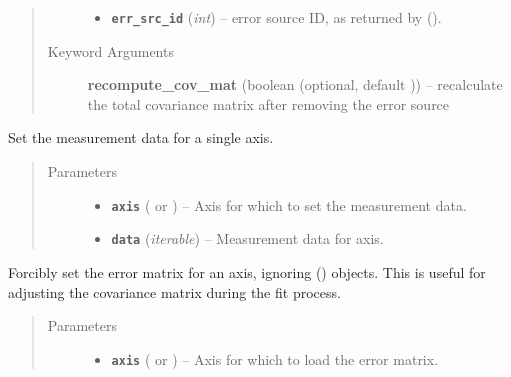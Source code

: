 \documentclass[a4paper,10pt,english]{sphinxmanual}
\begin{document}
\begin{fulllineitems}
\begin{fulllineitems}
\begin{quote}
\begin{description}
\begin{itemize}
\item {} 
\textbf{\texttt{err\_src\_id}} (\emph{int}) -- error source ID, as returned by
{\hyperref[index:kafe.dataset.Dataset.add_error_source]{\emph{}}} ().

\end{itemize}

\item[{Keyword Arguments}] \leavevmode
\textbf{recompute\_cov\_mat} (boolean (optional, default )) --
recalculate the total covariance matrix after removing the error
source

\end{description}\end{quote}

\end{fulllineitems}


\begin{fulllineitems}
\label{index:kafe.dataset.Dataset.set_axis_data}
Set the measurement data for a single axis.
\begin{quote}\begin{description}
\item[{Parameters}] \leavevmode\begin{itemize}
\item {} 
\textbf{\texttt{axis}} ( or ) -- Axis for which to set the measurement data.

\item {} 
\textbf{\texttt{data}} (\emph{iterable}) -- Measurement data for axis.

\end{itemize}

\end{description}\end{quote}

\end{fulllineitems}


\begin{fulllineitems}
\label{index:kafe.dataset.Dataset.set_cov_mat}
Forcibly set the error matrix for an axis, ignoring {\hyperref[index:kafe.dataset.ErrorSource]{\emph{}}} ()
objects. This is useful for adjusting the covariance matrix during the
fit process.
\begin{quote}\begin{description}
\item[{Parameters}] \leavevmode\begin{itemize}
\item {} 
\textbf{\texttt{axis}} ( or ) -- Axis for which to load the error matrix.


\end{itemize}
\end{description}
\end{quote}
\end{fulllineitems}
\end{fulllineitems}
\end{document}
